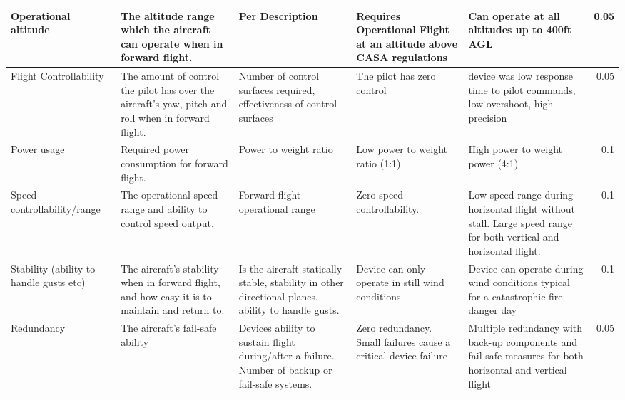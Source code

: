 \begin{table}[]
{\begin{tabular}{|p{2cm}|p{4cm}|p{4cm}|p{4cm}|p{4cm}|r|}
Operational altitude                                & The altitude range which the aircraft can operate when in forward flight.                           & Per Description                                                                                    & Requires Operational Flight at an altitude above CASA regulations & Can operate at all altitudes up to 400ft AGL                                                                       & 0.05      \\ \hline
Flight Controllability                                     & The amount of control the pilot has over the aircraft's yaw, pitch and roll when in forward flight. & Number of control surfaces required, effectiveness of control surfaces                             & The pilot has zero control                                        & device was low response time to pilot commands, low overshoot, high precision                                      & 0.05      \\ \hline
Power usage                                         & Required power consumption for forward flight.                                                      & Power to weight ratio                                                                              & Low power to weight ratio (1:1)                                   & High power to weight power (4:1)                                                                                   & 0.1       \\ \hline
Speed controllability/range                         & The operational speed range and ability to control speed output.                                    & Forward flight operational range                                                                   & Zero speed controllability.                                       & Low speed range during horizontal flight without stall. Large speed range for both vertical and horizontal flight. & 0.1       \\ \hline
Stability (ability to handle gusts etc)             & The aircraft's stability when in forward flight, and how easy it is to maintain and return to.      & Is the aircraft statically stable, stability in other directional planes, ability to handle gusts. & Device can only operate in still wind conditions                  & Device can operate during wind conditions typical for a catastrophic fire danger day                               & 0.1       \\ \hline
Redundancy                                          & The aircraft's fail-safe ability                                                                      & Devices ability to sustain flight during/after a failure. Number of backup or fail-safe systems.   & Zero redundancy. Small failures cause a critical device failure   & Multiple redundancy with back-up components and fail-safe measures for both horizontal and vertical flight         & 0.05      \\ \hline
\end{tabular}%
}
\end{table}



